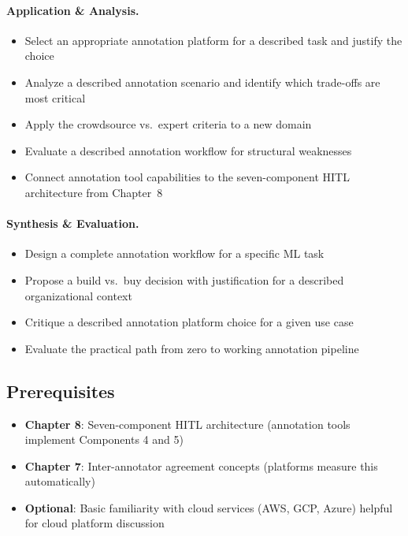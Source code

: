 \paragraph{Application \& Analysis.}
\begin{itemize}
    \item Select an appropriate annotation platform for a described task and justify the choice
    \item Analyze a described annotation scenario and identify which trade-offs are most critical
    \item Apply the crowdsource vs.\ expert criteria to a new domain
    \item Evaluate a described annotation workflow for structural weaknesses
    \item Connect annotation tool capabilities to the seven-component HITL architecture from Chapter~8
\end{itemize}

\paragraph{Synthesis \& Evaluation.}
\begin{itemize}
    \item Design a complete annotation workflow for a specific ML task
    \item Propose a build vs.\ buy decision with justification for a described organizational context
    \item Critique a described annotation platform choice for a given use case
    \item Evaluate the practical path from zero to working annotation pipeline
\end{itemize}

\subsection{Prerequisites}
\begin{itemize}
    \item \textbf{Chapter 8}: Seven-component HITL architecture (annotation tools implement Components 4 and 5)
    \item \textbf{Chapter 7}: Inter-annotator agreement concepts (platforms measure this automatically)
    \item \textbf{Optional}: Basic familiarity with cloud services (AWS, GCP, Azure) helpful for cloud platform discussion
\end{itemize}

